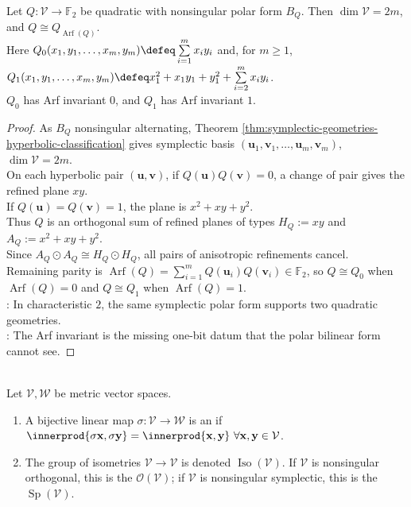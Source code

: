 \begin{theorem} \label{thm:f2-quadratic-refinements-arf-classification} \\
Let $Q:\mathcal{V}\to\mathbb{F}_2$ be quadratic with nonsingular polar form $B_Q$. Then $\dim\mathcal{V}=2m$, and $Q\cong Q_{\operatorname{Arf}(Q)}$.\\
Here $Q_0(x_1,y_1,\ldots,x_m,y_m) \defeq\sum\limits_{i=1}^{m}x_iy_i$ and, for $m\geq1$, $Q_1(x_1,y_1,\ldots,x_m,y_m) \defeq x_1^2+x_1y_1+y_1^2+\sum\limits_{i=2}^{m}x_iy_i$.\\
$Q_0$ has Arf invariant $0$, and $Q_1$ has Arf invariant $1$.
\begin{proof} As $B_Q$ nonsingular alternating, Theorem \ref{thm:symplectic-geometries-hyperbolic-classification} gives symplectic basis $(\mathbf{u}_1,\mathbf{v}_1,\ldots,\mathbf{u}_m,\mathbf{v}_m)$, $\dim\mathcal{V}=2m$.\\
On each hyperbolic pair $(\mathbf{u},\mathbf{v})$, if $Q(\mathbf{u})Q(\mathbf{v})=0$, a change of pair gives the refined plane $xy$.\\
If $Q(\mathbf{u})=Q(\mathbf{v})=1$, the plane is $x^2+xy+y^2$.\\
Thus $Q$ is an orthogonal sum of refined planes of types $H_Q:=xy$ and $A_Q:=x^2+xy+y^2$.\\
Since $A_Q\odot A_Q\cong H_Q\odot H_Q$, all pairs of anisotropic refinements cancel.\\
Remaining parity is $\operatorname{Arf}(Q)=\sum\limits_{i=1}^{m}Q(\mathbf{u}_i)Q(\mathbf{v}_i)\in\mathbb{F}_2$, so $Q\cong Q_0$ when $\operatorname{Arf}(Q)=0$ and $Q\cong Q_1$ when $\operatorname{Arf}(Q)=1$.\\
: In characteristic $2$, the same symplectic polar form supports two quadratic geometries.\\
: The Arf invariant is the missing one-bit datum that the polar bilinear form cannot see.
\end{proof}
\end{theorem}

\begin{definition} \label{def:metric-isometry-and-classical-groups} \\
Let $\mathcal{V},\mathcal{W}$ be metric vector spaces.
\begin{enumerate}[label=(\roman*)]
\setlength{\itemsep}{0pt}
\item A bijective linear map $\sigma:\mathcal{V}\to\mathcal{W}$ is an  if $\innerprod{\sigma\mathbf{x},\sigma\mathbf{y}} =\innerprod{\mathbf{x},\mathbf{y}} \ \forall \mathbf{x},\mathbf{y}\in\mathcal{V}$.
\item The group of isometries $\mathcal{V}\to\mathcal{V}$ is denoted $\operatorname{Iso}(\mathcal{V})$. If $\mathcal{V}$ is nonsingular orthogonal, this is the  $\mathcal{O}(\mathcal{V})$; if $\mathcal{V}$ is nonsingular symplectic, this is the  $\operatorname{Sp}(\mathcal{V})$.
\end{enumerate}
\end{definition}


